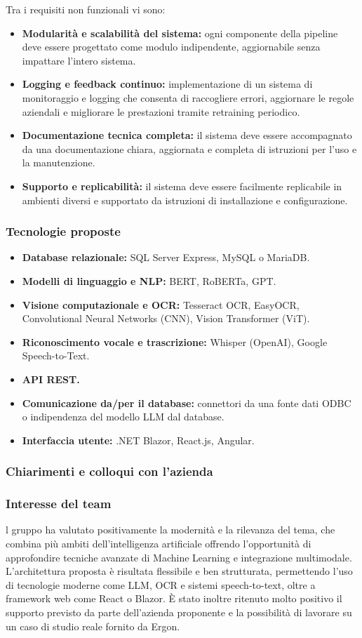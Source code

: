 \documentclass[a4paper,11pt]{article}
\begin{document}
Tra i requisiti non funzionali vi sono:
\begin{itemize}
  \item \textbf{Modularità e scalabilità del sistema:} ogni componente della pipeline deve essere progettato come modulo indipendente, aggiornabile senza impattare l’intero sistema.
  \item \textbf{Logging e feedback continuo:} implementazione di un sistema di monitoraggio e logging che consenta di raccogliere errori, aggiornare le regole aziendali e migliorare le prestazioni tramite retraining periodico.
  \item \textbf{Documentazione tecnica completa:} il sistema deve essere accompagnato da una documentazione chiara, aggiornata e completa di istruzioni per l’uso e la manutenzione.
  \item \textbf{Supporto e replicabilità:} il sistema deve essere facilmente replicabile in ambienti diversi e supportato da istruzioni di installazione e configurazione.
\end{itemize}
\subsubsection{Tecnologie proposte}
\begin{itemize}[noitemsep, topsep=0pt]
  \item \textbf{Database relazionale:} SQL Server Express, MySQL o MariaDB.
  \item \textbf{Modelli di linguaggio e NLP:} BERT, RoBERTa, GPT.
  \item \textbf{Visione computazionale e OCR:} Tesseract OCR, EasyOCR, Convolutional Neural Networks (CNN), Vision Transformer (ViT).
  \item \textbf{Riconoscimento vocale e trascrizione:} Whisper (OpenAI), Google Speech-to-Text.
  \item \textbf{API REST.}
  \item \textbf{Comunicazione da/per il database:} connettori da una fonte dati ODBC o indipendenza del modello LLM dal database.
  \item \textbf{Interfaccia utente:} .NET Blazor, React.js, Angular.
\end{itemize}

\subsubsection{Chiarimenti e colloqui con l'azienda}
\subsubsection{Interesse del team}
\parbox[t]{\linewidth}{%
l gruppo ha valutato positivamente la modernità e la rilevanza del tema, che
combina più ambiti dell'intelligenza artificiale offrendo l'opportunità di
approfondire tecniche avanzate di Machine Learning e integrazione multimodale.
L'architettura proposta è risultata flessibile e ben strutturata, permettendo l'uso di
tecnologie moderne come LLM, OCR e sistemi speech-to-text, oltre a framework
web come React o Blazor. È stato inoltre ritenuto molto positivo il supporto
previsto da parte dell'azienda proponente e la possibilità di lavorare su un caso di
studio reale fornito da Ergon.
}
\end{document}

